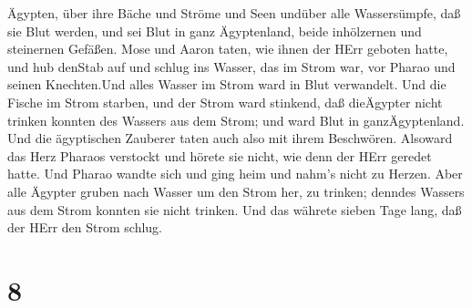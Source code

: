Ägypten, über ihre Bäche und Ströme und Seen undüber alle Wassersümpfe,
daß sie Blut werden, und sei Blut in ganz Ägyptenland, beide inhölzernen
und steinernen Gefäßen.  Mose und Aaron taten, wie ihnen
der HErr geboten hatte, und hub denStab auf und schlug ins Wasser, das
im Strom war, vor Pharao und seinen Knechten.Und alles Wasser im Strom
ward in Blut verwandelt.  Und die Fische im Strom starben,
und der Strom ward stinkend, daß dieÄgypter nicht trinken konnten des
Wassers aus dem Strom; und ward Blut in ganzÄgyptenland. 
Und die ägyptischen Zauberer taten auch also mit ihrem Beschwören.
Alsoward das Herz Pharaos verstockt und hörete sie nicht, wie denn der
HErr geredet hatte.  Und Pharao wandte sich und ging heim
und nahm's nicht zu Herzen.  Aber alle Ägypter gruben nach
Wasser um den Strom her, zu trinken; denndes Wassers aus dem Strom
konnten sie nicht trinken.  Und das währete sieben Tage
lang, daß der HErr den Strom schlug.

\hypertarget{section-7}{%
\section{8}\label{section-7}}

